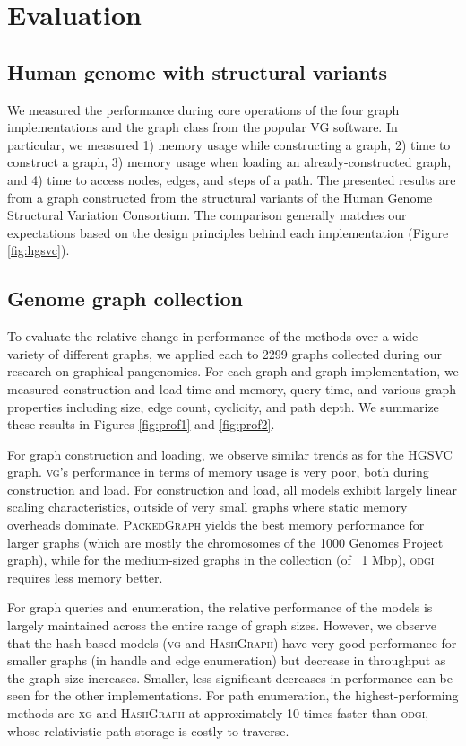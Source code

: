 \documentclass{article}
\begin{document}
\section{Evaluation}

\subsection{Human genome with structural variants}

We measured the performance during core operations of the four graph implementations and the graph class from the popular \textsc{VG} software.
In particular, we measured 1) memory usage while constructing a graph, 2) time to construct a graph, 3) memory usage when loading an already-constructed graph, and 4) time to access nodes, edges, and steps of a path.
The presented results are from a graph constructed from the structural variants of the Human Genome Structural Variation Consortium.
The comparison generally matches our expectations based on the design principles behind each implementation (Figure \ref{fig:hgsvc}).

\subsection{Genome graph collection}

To evaluate the relative change in performance of the methods over a wide variety of different graphs, we applied each to 2299 graphs collected during our research on graphical pangenomics.
For each graph and graph implementation, we measured construction and load time and memory, query time, and various graph properties including size, edge count, cyclicity, and path depth.
We summarize these results in Figures \ref{fig:prof1} and \ref{fig:prof2}.

For graph construction and loading, we observe similar trends as for the HGSVC graph.
\textsc{vg}'s performance in terms of memory usage is very poor, both during construction and load.
For construction and load, all models exhibit largely linear scaling characteristics, outside of very small graphs where static memory overheads dominate.
\textsc{PackedGraph} yields the best memory performance for larger graphs (which are mostly the chromosomes of the 1000 Genomes Project graph), while for the medium-sized graphs in the collection (of ~1 Mbp), \textsc{odgi} requires less memory better.

For graph queries and enumeration, the relative performance of the models is largely maintained across the entire range of graph sizes.
However, we observe that the hash-based models (\textsc{vg} and \textsc{HashGraph}) have very good performance for smaller graphs (in handle and edge enumeration) but decrease in throughput as the graph size increases.
Smaller, less significant decreases in performance can be seen for the other implementations.
For path enumeration, the highest-performing methods are \textsc{xg} and \textsc{HashGraph} at approximately 10 times faster than \textsc{odgi}, whose relativistic path storage is costly to traverse.
\end{document}
